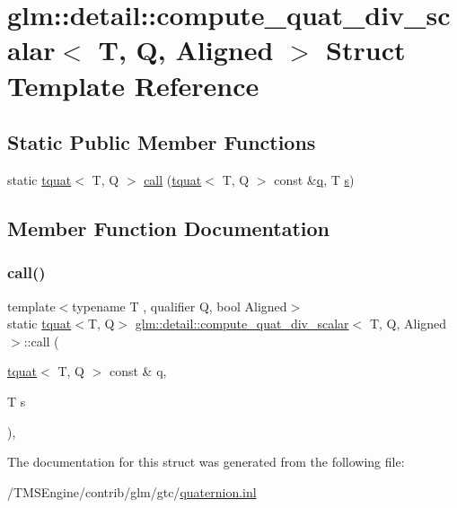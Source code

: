 \hypertarget{structglm_1_1detail_1_1compute__quat__div__scalar}{}\section{glm\+:\+:detail\+:\+:compute\+\_\+quat\+\_\+div\+\_\+scalar$<$ T, Q, Aligned $>$ Struct Template Reference}
\label{structglm_1_1detail_1_1compute__quat__div__scalar}
\subsection*{Static Public Member Functions}
\begin{DoxyCompactItemize}
\item 
static \hyperlink{structglm_1_1tquat}{tquat}$<$ T, Q $>$ \hyperlink{structglm_1_1detail_1_1compute__quat__div__scalar_a669dfccba8f8cbe2d8309c09b939996e}{call} (\hyperlink{structglm_1_1tquat}{tquat}$<$ T, Q $>$ const \&\hyperlink{_s_d_l__opengl_8h_a8fc1e7b9baaae687804c7eed46ca09c6}{q}, T \hyperlink{_s_d_l__opengl_8h_a4af680a6c683f88ed67b76f207f2e6e4}{s})
\end{DoxyCompactItemize}


\subsection{Member Function Documentation}
\mbox{\label{structglm_1_1detail_1_1compute__quat__div__scalar_a669dfccba8f8cbe2d8309c09b939996e}} 
\subsubsection{\texorpdfstring{call()}{call()}}
{\footnotesize\ttfamily template$<$typename T , qualifier Q, bool Aligned$>$ \\
static \hyperlink{structglm_1_1tquat}{tquat}$<$T, Q$>$ \hyperlink{structglm_1_1detail_1_1compute__quat__div__scalar}{glm\+::detail\+::compute\+\_\+quat\+\_\+div\+\_\+scalar}$<$ T, Q, Aligned $>$\+::call (\begin{DoxyParamCaption}\item[{\hyperlink{structglm_1_1tquat}{tquat}$<$ T, Q $>$ const \&}]{q,  }\item[{T}]{s }\end{DoxyParamCaption})\hspace{0.3cm}{\ttfamily [inline]}, {\ttfamily [static]}}



The documentation for this struct was generated from the following file\+:\begin{DoxyCompactItemize}
\item 
/\+T\+M\+S\+Engine/contrib/glm/gtc/\hyperlink{gtc_2quaternion_8inl}{quaternion.\+inl}\end{DoxyCompactItemize}
